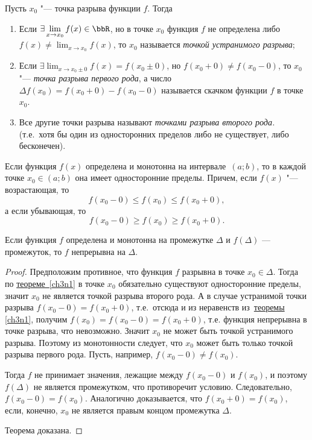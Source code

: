 \begin{defn}
Пусть $x_0$ "--- точка разрыва функции $f$. Тогда 
\begin{enumerate}[wide, labelwidth=!, labelindent=0pt]
\item
Если $\exists \lim_{x \to x_0}\limits f(x) \in \bbR$, но в точке $x_0$ функция $f$ не определена либо $f(x)\ne \lim_{x\to x_0} f(x)$, то $x_0$ называется \textit{точкой устранимого разрыва};

\vspace*{\baselineskip}
\item
Если $\exists \lim_{x \to x_0\pm0}\limits f(x)=f(x_0\pm 0)$, но $f(x_0+0)\ne f(x_0-0)$, то $x_0$ "--- \textit{точка разрыва первого рода}, а число $\Delta f(x_0)=f(x_0+0)-f(x_0-0)$ называется скачком функции $f$ в точке $x_0$.

\vspace*{\baselineskip}
\item
Все другие точки разрыва называют \textit{точками разрыва второго рода.} (т.е.~хотя бы один из односторонних пределов либо не существует, либо бесконечен).
\end{enumerate}
\end{defn}
\begin{thm} \label{ch3n1} 
Если функция $f(x)$ определена и монотонна на интервале~$(a;b)$, то в каждой точке $x_0\in(a;b)$ она имеет односторонние пределы. Причем, если $f(x)$ "--- возрастающая, то 
$$
f(x_0-0)\le f(x_0)\le f(x_0+0),
$$
а если убывающая, то
$$
f(x_0-0)\ge f(x_0)\ge f(x_0+0).
$$
\end{thm}
\begin{thm} \label{ch3n3} 
Если функция $f$ определена и монотонна на промежутке $\Delta$ и $f(\Delta)$ — промежуток, то $f$ непрерывна на $\Delta$.
\end{thm}
\begin{proof}
Предположим противное, что функция $f$ разрывна в точке $x_0 \in\Delta$. Тогда по \hyperref[ch3n1]{теореме~\ref{ch3n1}} в точке $x_0$ обязательно существуют односторонние пределы, значит $x_0$ не является точкой разрыва второго рода.  А в случае устранимой точки разрыва $f(x_0-0)=f(x_0+0)$, т.е.~отсюда и из неравенств из~\hyperref[ch3n1]{теоремы \ref{ch3n1}}, получим $f(x_0)=f(x_0-0)=f(x_0+0)$, т.е. функция непрерывна в точке разрыва, что невозможно. Значит $x_0$ не может быть точкой устранимого разрыва. Поэтому из монотонности следует, что $x_0$ может быть только точкой разрыва первого рода. Пусть, например, $f(x_0-0)\ne f(x_0)$.

Тогда $f$ не принимает значения, лежащие между $f(x_0 - 0)$ и $f(x_0)$, и поэтому $f(\Delta)$ не является промежутком, что противоречит условию. Следовательно, $f(x_0-0) = f(x_0)$. Аналогично доказывается, что  $f(x_0 + 0) = f(x_0)$, если, конечно, $x_0$ не является правым концом промежутка $\Delta$. 

Теорема доказана.
\end{proof} 